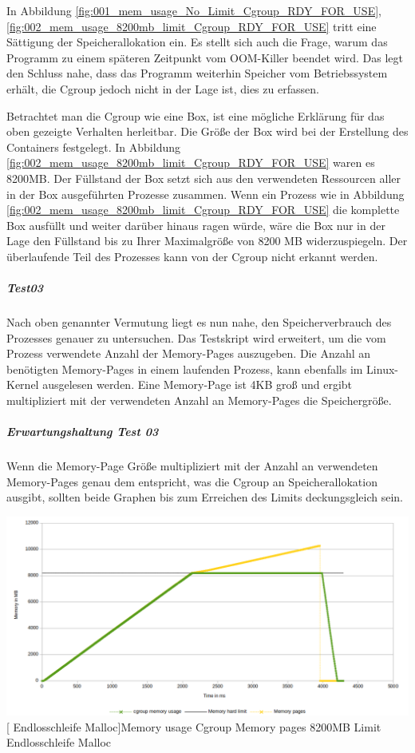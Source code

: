 In Abbildung \ref{fig:001_mem_usage_No_Limit_Cgroup_RDY_FOR_USE}, \ref{fig:002_mem_usage_8200mb_limit_Cgroup_RDY_FOR_USE} tritt eine Sättigung der Speicherallokation ein. Es stellt sich auch die Frage, warum das Programm zu einem späteren Zeitpunkt vom OOM-Killer beendet wird. Das legt den Schluss nahe, dass das Programm weiterhin Speicher vom Betriebssystem erhält, die Cgroup jedoch nicht in der Lage ist, dies zu erfassen. 

Betrachtet man die Cgroup wie eine Box, ist eine mögliche Erklärung für das oben gezeigte Verhalten herleitbar. Die Größe der Box wird bei der Erstellung des Containers festgelegt. In Abbildung \ref{fig:002_mem_usage_8200mb_limit_Cgroup_RDY_FOR_USE} waren es 8200MB. Der Füllstand der Box setzt sich aus den verwendeten Ressourcen aller in der Box ausgeführten Prozesse zusammen. Wenn ein Prozess wie in Abbildung \ref{fig:002_mem_usage_8200mb_limit_Cgroup_RDY_FOR_USE} die komplette Box ausfüllt und weiter darüber hinaus ragen würde, wäre die Box nur in der Lage den Füllstand bis zu Ihrer Maximalgröße von 8200 MB widerzuspiegeln. Der überlaufende Teil des Prozesses kann von der Cgroup nicht erkannt werden.

\subparagraph{Test03}
Nach oben genannter Vermutung liegt es nun nahe, den Speicherverbrauch des Prozesses genauer zu untersuchen. Das Testskript wird erweitert, um die vom Prozess verwendete Anzahl der Memory-Pages auszugeben. Die Anzahl an benötigten Memory-Pages in einem laufenden Prozess, kann ebenfalls im Linux-Kernel ausgelesen werden. Eine Memory-Page ist 4KB groß und ergibt multipliziert mit der verwendeten Anzahl an Memory-Pages die Speichergröße.

\subparagraph{Erwartungshaltung Test 03}
Wenn die Memory-Page Größe multipliziert mit der Anzahl an verwendeten Memory-Pages genau dem entspricht, was die Cgroup an Speicherallokation ausgibt, sollten beide Graphen bis zum Erreichen des Limits deckungsgleich sein.

\vspace{1em}
\begin{minipage}{\linewidth}
	\centering
	\includegraphics[width=1\linewidth]{pics/003_mem_usage_8200mb_limit_Cgroup_Pages_RDY_FOR_USE.png}
	[ Endlosschleife Malloc]{Memory usage Cgroup Memory pages 8200MB Limit Endlosschleife Malloc}
	\label{fig:003_mem_usage_8200mb_limit_Cgroup_Pages_RDY_FOR_USE}
\end{minipage}

